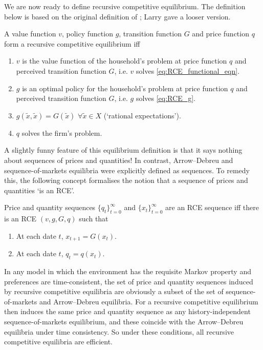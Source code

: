 \documentclass[11pt,letterpaper,reqno,oneside]{article}
\begin{document}
We are now ready to define recursive competitive equilibrium. The definition below is based on the original definition of \textcite{PrescottMehra1980}; Larry gave a looser version.

\begin{definition}
	A value function $v$, policy function $g$, transition function $G$ and price function $q$ form a recursive competitive equilibrium iff
	\begin{enumerate}

		\item $v$ is the value function of the household's problem at price function $q$ and perceived transition function $G$, i.e. $v$ solves \eqref{eq:RCE_functional_eqn}.

		\item $g$ is an optimal policy for the household's problem at price function $q$ and perceived transition function $G$, i.e. $g$ solves \eqref{eq:RCE_g}.

		\item $g\left(\widetilde{x},\widetilde{x}\right) = G\left(\widetilde{x}\right)$ $\forall \widetilde{x} \in X$ (`rational expectations').

		\item $q$ solves the firm's problem.

	\end{enumerate}	
\end{definition}

A slightly funny feature of this equilibrium definition is that it says nothing about sequences of prices and quantities! In contrast, Arrow--Debreu and sequence-of-markets equilibria were explicitly defined as sequences. To remedy this, the following concept formalises the notion that a sequence of prices and quantities `is an RCE'.
%
\begin{definition}
	Price and quantity sequences $\{ q_t \}_{t=0}^\infty$ and $\{ x_t \}_{t=0}^\infty$ are an RCE sequence iff there is an RCE $(v,g,G,q)$ such that 
	\begin{enumerate}

		\item At each date $t$, $x_{t+1} = G(x_t)$.

		\item At each date $t$, $q_t = q(x_t)$.

	\end{enumerate}	
\end{definition}


In any model in which the environment has the requisite Markov property and preferences are time-consistent, the set of price and quantity sequences induced by recursive competitive equilibria are obviously a subset of the set of sequence-of-markets and Arrow--Debreu equilibria. For a recursive competitive equilibrium then induces the same price and quantity sequence as any history-independent sequence-of-markets equilibrium, and these coincide with the Arrow--Debreu equilibria under time consistency. So under these conditions, all recursive competitive equilibria are efficient.
\end{document}
